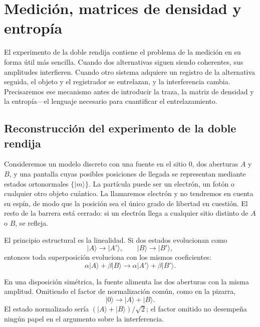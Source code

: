 \chapter{Medición, matrices de densidad y entropía}

El experimento de la doble rendija contiene el problema de la medición en su forma útil más sencilla. Cuando dos alternativas siguen siendo coherentes, sus amplitudes interfieren. Cuando otro sistema adquiere un registro de la alternativa seguida, el objeto y el registrador se entrelazan, y la interferencia cambia. Precisaremos ese mecanismo antes de introducir la traza, la matriz de densidad y la entropía---el lenguaje necesario para cuantificar el entrelazamiento.

\section{Reconstrucción del experimento de la doble rendija}

Consideremos un modelo discreto con una fuente en el sitio \(0\), dos aberturas \(A\) y \(B\), y una pantalla cuyas posibles posiciones de llegada se representan mediante estados ortonormales \(\{|m\rangle\}\). La partícula puede ser un electrón, un fotón o cualquier otro objeto cuántico. La llamaremos electrón y no tendremos en cuenta su espín, de modo que la posición sea el único grado de libertad en cuestión. El resto de la barrera está cerrado: si un electrón llega a cualquier sitio distinto de \(A\) o \(B\), se refleja.

El principio estructural es la linealidad. Si dos estados evolucionan como
\begin{equation}
|A\rangle\longrightarrow |A'\rangle,
\qquad
|B\rangle\longrightarrow |B'\rangle,
\end{equation}
entonces toda superposición evoluciona con los mismos coeficientes:
\begin{equation}
\alpha|A\rangle+\beta|B\rangle
\longrightarrow
\alpha|A'\rangle+\beta|B'\rangle.
\end{equation}

En una disposición simétrica, la fuente alimenta las dos aberturas con la misma amplitud. Omitiendo el factor de normalización común, como en la pizarra,
\begin{equation}
|0\rangle\longrightarrow |A\rangle+|B\rangle.
\end{equation}
El estado normalizado sería \((|A\rangle+|B\rangle)/\sqrt{2}\); el factor omitido no desempeña ningún papel en el argumento sobre la interferencia.

